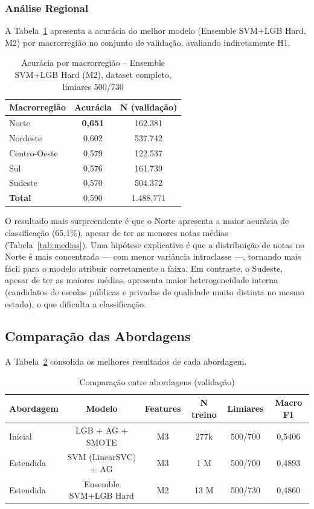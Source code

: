 \documentclass[12pt]{article}
\begin{document}
\subsubsection{Análise Regional}

A Tabela~\ref{tab:regional} apresenta a acurácia do melhor modelo
(Ensemble SVM+LGB Hard, M2) por macrorregião no conjunto de validação,
avaliando indiretamente H1.

\begin{table}[H]
\centering
\caption{Acurácia por macrorregião -- Ensemble SVM+LGB Hard (M2),
         dataset completo, limiares 500/730}
\label{tab:regional}
\small
\begin{tabular}{lcc}
\toprule
\textbf{Macrorregião} & \textbf{Acurácia} & \textbf{N (validação)} \\
\midrule
Norte        & \textbf{0,651} & 162.381 \\
Nordeste     & 0,602 & 537.742 \\
Centro-Oeste & 0,579 & 122.537 \\
Sul          & 0,576 & 161.739 \\
Sudeste      & 0,570 & 504.372 \\
\midrule
\textbf{Total} & 0,590 & 1.488.771 \\
\bottomrule
\end{tabular}
\end{table}

O resultado mais surpreendente é que o Norte apresenta a maior acurácia
de classificação (65,1\%), apesar de ter as menores notas médias
(Tabela~\ref{tab:medias}). Uma hipótese explicativa é que a distribuição
de notas no Norte é mais concentrada --- com menor variância intraclasse
---, tornando mais fácil para o modelo atribuir corretamente a faixa. Em
contraste, o Sudeste, apesar de ter as maiores médias, apresenta maior
heterogeneidade interna (candidatos de escolas públicas e privadas de
qualidade muito distinta no mesmo estado), o que dificulta a
classificação.

\subsection{Comparação das Abordagens}

A Tabela~\ref{tab:comparacao} consolida os melhores resultados de cada
abordagem.

\begin{table}[H]
\centering
\caption{Comparação entre abordagens (validação)}
\label{tab:comparacao}
\small
\begin{tabular}{lccccc}
\toprule
\textbf{Abordagem} & \textbf{Modelo} & \textbf{Features} & \textbf{N treino} & \textbf{Limiares} & \textbf{Macro F1} \\
\midrule
Inicial    & LGB + AG + SMOTE      & M3 & 277k  & 500/700 & 0,5406 \\
Estendida  & SVM (LinearSVC) + AG  & M3 & 1 M   & 500/700 & 0,4893 \\
Estendida  & Ensemble SVM+LGB Hard & M2 & 13 M  & 500/730 & 0,4860 \\
\bottomrule
\end{tabular}
\end{table}
\end{document}
